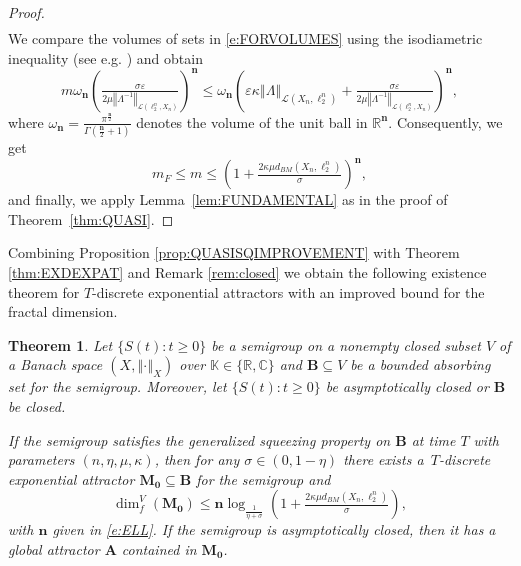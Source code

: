 \documentclass[a4paper,12pt,reqno]{amsart}
\theoremstyle{plain}
\newtheorem{thm}[lem]{Theorem}
\theoremstyle{definition}
\numberwithin{equation}{section}
\newcommand{\R}{\mathbb{R}}
\newcommand{\C}{\mathbb{C}}
\newcommand{\norm}[1]{\left\Vert#1\right\Vert}
\newcommand{\eps}{\varepsilon}
\newcommand{\dimf}{\operatorname{dim}_{f}}
\renewcommand{\geq}{\geqslant}
\renewcommand{\leq}{\leqslant}
\begin{document}
\begin{proof}
\begin{equation*}
\begin{split}
\end{split}
\end{equation*}
We compare the volumes of sets in \eqref{e:FORVOLUMES} using the isodiametric inequality (see e.g. \cite[Theorem 2.4]{EG15}) and obtain
$$m\omega_{\mathbf{n}} \left(\tfrac{\sigma\eps}{2\mu\norm{\Lambda^{-1}}_{\mathcal{L}(\ell^n_2,X_n)}}\right)^{\mathbf{n}}\leq\omega_{\mathbf{n}}\left(\eps\kappa\norm{\Lambda}_{\mathcal{L}(X_n,\ell^n_2)}+\tfrac{\sigma\eps}{2\mu\norm{\Lambda^{-1}}_{\mathcal{L}(\ell^n_2,X_n)}}\right)^{\mathbf{n}},$$
where $\omega_{\mathbf{n}}=\frac{\pi^{\frac{\mathbf{n}}{2}}}{\Gamma(\frac{\mathbf{n}}{2}+1)}$ denotes the volume of the unit ball in $\R^{\mathbf{n}}$.
Consequently, we get
\begin{equation*}
m_{F}\leq m\leq \left(1+\tfrac{2\kappa\mu d_{BM}(X_n,\ell^n_2)}{\sigma}\right)^{\mathbf{n}},
\end{equation*}
and finally, we apply Lemma~\ref{lem:FUNDAMENTAL} as in the proof of Theorem~\ref{thm:QUASI}.
\end{proof}

Combining Proposition \ref{prop:QUASISQIMPROVEMENT} with Theorem \ref{thm:EXDEXPAT} and Remark \ref{rem:closed} we obtain the following existence theorem for $T$-discrete exponential attractors with an improved bound for the fractal dimension.

\begin{thm}\label{thm:SQEXPIMPROVED}
Let $\{S(t)\colon t\geq 0\}$ be a semigroup on a nonempty closed subset $V$ of a Banach space $(X,\norm{\cdot}_{X})$ over $\mathbb{K}\in\{\R,\C\}$ and $\mathbf{B}\subseteq V$ be a bounded absorbing set for the semigroup. Moreover, let $\{S(t)\colon t\geq 0\}$ be asymptotically closed or $\mathbf{B}$ be closed. 

If the semigroup satisfies the generalized squeezing property on $\mathbf{B}$ at time $T$ with parameters $(n,\eta,\mu,\kappa)$,
then for any $\sigma\in (0,1-\eta)$ there exists a~$T$-discrete exponential attractor $\mathbf{M_0}\subseteq \mathbf{B}$ for the semigroup and 
\begin{equation}\label{e:SQUEEZING}
\dimf^{V}(\mathbf{M_0})\leq \mathbf{n}\log_{\frac{1}{\eta+\sigma}}\left(1+\tfrac{2\kappa\mu d_{BM}(X_n,\ell^n_2)}{\sigma}\right),
\end{equation}
with $\mathbf{n}$ given in \eqref{e:ELL}. If the semigroup is asymptotically closed, then it has a global attractor $\mathbf{A}$  contained in $\mathbf{M_0}$.
\end{thm}
\end{document}
